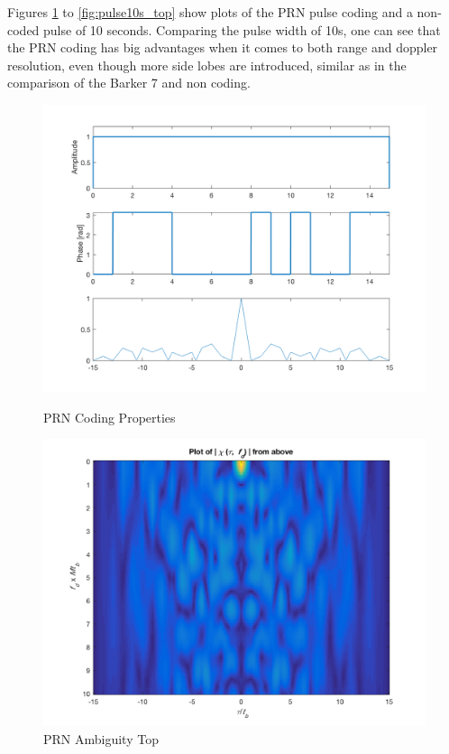 Figures \ref{fig:PRN_props} to \ref{fig:pulse10s_top} show plots of the PRN pulse coding and a non-coded pulse of 10 seconds. Comparing the pulse width of 10s, one can see that the PRN coding has big advantages when it comes to both range and doppler resolution, even though more side lobes are introduced, similar as in the comparison of the Barker 7 and non coding.

\begin{figure}[!htbp]
  \centering
  \begin{minipage}[b]{0.45\textwidth}
    \includegraphics[width=\textwidth]{images/prn_props}
    \caption{PRN Coding Properties}
    \label{fig:PRN_props}
  \end{minipage}
  \hfill
      \begin{minipage}[b]{0.45\textwidth}
    \includegraphics[width=\textwidth]{images/prn_top}
    \caption{PRN Ambiguity Top}
  \end{minipage}
\end{figure}

